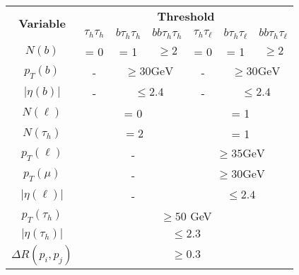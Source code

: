\begin{tabular}{|c|cccccc|}
\hline
\multirow{2}{*}{\textbf{Variable}} & \multicolumn{6}{c|}{\textbf{Threshold}} \bigstrut\\ 
\cline{2-7} 
                                   & \multicolumn{1}{c|}{$\tau_{h} \tau_{h}$} & \multicolumn{1}{c|}{$b \tau_{h} \tau_{h}$} & \multicolumn{1}{c|}{$b b \tau_{h} \tau_{h}$} & \multicolumn{1}{c|}{$\tau_{h} \tau_{\ell}$} & \multicolumn{1}{c|}{$b \tau_{h} \tau_{\ell}$} & $b b \tau_{h} \tau_{\ell}$ \bigstrut\\ \hline \hline


$N(b)$                             & \multicolumn{1}{c|}{= 0} & \multicolumn{1}{c|}{= 1} & \multicolumn{1}{c|}{$\geq 2$} & \multicolumn{1}{c|}{= 0}& \multicolumn{1}{c|}{= 1} & $\geq 2$ \bigstrut\\ \hline
$p_T(b)$                         & \multicolumn{1}{c|}{-} & \multicolumn{2}{c|}{$\geq 30 \textrm{GeV}$ } & \multicolumn{1}{c|}{-} & \multicolumn{2}{c|}{$\geq 30 \textrm{GeV}$ } \bigstrut\\ \hline
$|\eta(b)|$                        & \multicolumn{1}{c|}{-} &\multicolumn{2}{c|}{$\leq 2.4$} & \multicolumn{1}{c|}{-} &\multicolumn{2}{c|}{$\leq 2.4$} \bigstrut\\ \hline
                                  
$N (\ell)$                         & \multicolumn{3}{c|}{= 0}  & \multicolumn{3}{c|}{= 1} \bigstrut\\ \hline
$N(\tau_{h})$                      & \multicolumn{3}{c|}{ $= 2$} & \multicolumn{3}{c|}{= 1} \bigstrut\\ \hline
$p_T(\ell)$                         & \multicolumn{3}{c|}{-} & \multicolumn{3}{c|}{$\geq 35 \textrm{GeV}$} \bigstrut\\ \hline
$p_T(\mu)$                       & \multicolumn{3}{c|}{-} & \multicolumn{3}{c|}{$\geq 30 \textrm{GeV}$} \bigstrut\\ \hline
$|\eta(\ell)|$                     & \multicolumn{3}{c|}{-} & \multicolumn{3}{c|}{$\leq 2.4$} \bigstrut\\ \hline
$p_T(\tau_h)$                    & \multicolumn{6}{c|}{$\geq 50$ GeV} \bigstrut\\ \hline
$|\eta(\tau_h)|$                   & \multicolumn{6}{c|}{$\leq 2.3$} \bigstrut\\ \hline
$\Delta R(p_{i}, p_{j})$           & \multicolumn{6}{c|}{$\geq 0.3$} \bigstrut\\ \hline

\end{tabular}
